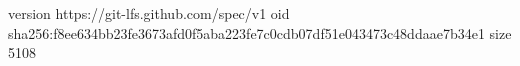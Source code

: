 version https://git-lfs.github.com/spec/v1
oid sha256:f8ee634bb23fe3673afd0f5aba223fe7c0cdb07df51e043473c48ddaae7b34e1
size 5108
